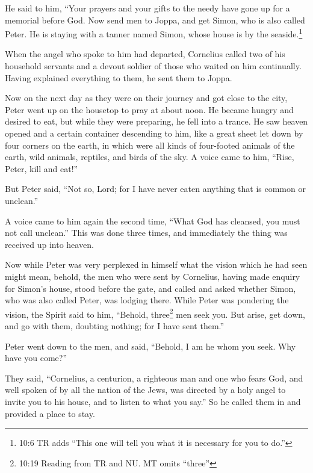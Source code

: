 He said to him, ``Your prayers and your gifts to the needy have gone up
for a memorial before God.  Now send men to Joppa, and get
Simon, who is also called Peter.  He is staying with a
tanner named Simon, whose house is by the seaside.\footnote{10:6 TR adds
  ``This one will tell you what it is necessary for you to do.''}

 When the angel who spoke to him had departed, Cornelius
called two of his household servants and a devout soldier of those who
waited on him continually.  Having explained everything to
them, he sent them to Joppa.

 Now on the next day as they were on their journey and got
close to the city, Peter went up on the housetop to pray at about noon.
 He became hungry and desired to eat, but while they were
preparing, he fell into a trance.  He saw heaven opened and
a certain container descending to him, like a great sheet let down by
four corners on the earth,  in which were all kinds of
four-footed animals of the earth, wild animals, reptiles, and birds of
the sky.  A voice came to him, ``Rise, Peter, kill and
eat!''

 But Peter said, ``Not so, Lord; for I have never eaten
anything that is common or unclean.''

 A voice came to him again the second time, ``What God has
cleansed, you must not call unclean.''  This was done three
times, and immediately the thing was received up into heaven.

 Now while Peter was very perplexed in himself what the
vision which he had seen might mean, behold, the men who were sent by
Cornelius, having made enquiry for Simon's house, stood before the gate,
 and called and asked whether Simon, who was also called
Peter, was lodging there.  While Peter was pondering the
vision, the Spirit said to him, ``Behold, three\footnote{10:19 Reading
  from TR and NU. MT omits ``three''} men seek you.  But
arise, get down, and go with them, doubting nothing; for I have sent
them.''

 Peter went down to the men, and said, ``Behold, I am he
whom you seek. Why have you come?''

 They said, ``Cornelius, a centurion, a righteous man and
one who fears God, and well spoken of by all the nation of the Jews, was
directed by a holy angel to invite you to his house, and to listen to
what you say.''  So he called them in and provided a place
to stay.

